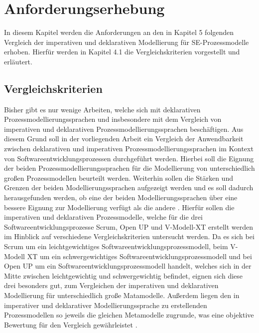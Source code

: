 
\chapter{Anforderungserhebung}\label{sec:chapter5}
In diesem Kapitel werden die Anforderungen an den in Kapitel 5 folgenden Vergleich der imperativen und deklarativen Modellierung für SE-Prozessmodelle erhoben. Hierfür werden in Kapitel 4.1 die Vergleichskriterien vorgestellt und erläutert.

\section{Vergleichskriterien}\label{sec:chapter5:Vergleichskriterien}

Bisher gibt es nur wenige Arbeiten, welche sich mit deklarativen Prozessmodellierungssprachen und insbesondere mit dem Vergleich von imperativen und deklarativen Prozessmodellierungssprachen beschäftigen. Aus diesem Grund soll in der vorliegenden Arbeit ein Vergleich der Anwendbarkeit zwischen deklarativen und imperativen Prozessmodellierungssprachen im Kontext von Softwareentwicklungsprozessen durchgeführt werden. Hierbei soll die Eignung der beiden Prozessmodellierungssprachen für die Modellierung von unterschiedlich großen Prozessmodellen beurteilt werden. Weiterhin sollen die Stärken und Grenzen der beiden Modellierungssprachen aufgezeigt werden und es soll dadurch herausgefunden werden, ob eine der beiden Modellierungssprachen über eine bessere Eignung zur Modellierung verfügt als die andere \cite{list2006evaluation}.\newline
Hierfür sollen die imperativen und deklarativen Prozessmodelle, welche für die drei Softwareentwicklungsprozesse Scrum, Open UP und V-Modell-XT erstellt werden im Hinblick auf verschiedene Vergleichskriterien untersucht werden. Da es sich bei Scrum um ein leichtgewichtiges Softwareentwicklungsprozessmodell, beim V-Modell XT um ein schwergewichtiges Softwareentwicklungsprozessmodell und bei Open UP um ein Softwareentwicklungsprozessmodell handelt, welches sich in der Mitte zwischen leichtgewichtig und schwergewichtig befindet, eignen sich diese drei besonders gut, zum Vergleichen der imperativen und deklarativen Modellierung für unterschiedlich große Matamodelle. Außerdem liegen den in imperativer und deklarativer Modellierungssprache zu erstellenden Prozessmodellen so jeweils die gleichen Metamodelle zugrunde, was eine objektive Bewertung für den Vergleich gewährleistet \cite{list2006evaluation}.  

